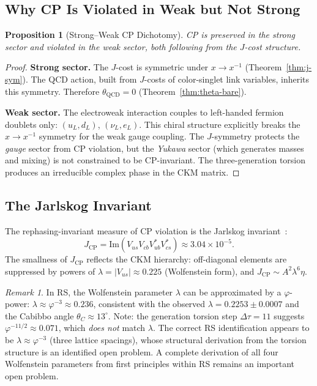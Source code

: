 \documentclass[12pt,a4paper]{article}
\newtheorem{proposition}[theorem]{Proposition}
\theoremstyle{definition}
\theoremstyle{remark}
\newtheorem{remark}[theorem]{Remark}
\begin{document}
\subsection{Why CP Is Violated in Weak but Not Strong}

\begin{proposition}[Strong--Weak CP Dichotomy]
\label{prop:dichotomy}
CP is preserved in the strong sector and violated in the weak
sector, both following from the $J$-cost structure.
\end{proposition}

\begin{proof}
\textbf{Strong sector.}
The $J$-cost is symmetric under $x \to x^{-1}$
(Theorem~\ref{thm:j-sym}).  The QCD action, built from
$J$-costs of color-singlet link variables, inherits this
symmetry.  Therefore $\theta_{\mathrm{QCD}} = 0$
(Theorem~\ref{thm:theta-bare}).

\textbf{Weak sector.}
The electroweak interaction couples to left-handed fermion
doublets only: $(u_L, d_L)$, $(\nu_L, e_L)$.  This chiral
structure explicitly breaks the $x \to x^{-1}$ symmetry for
the weak gauge coupling.  The $J$-symmetry protects the
\emph{gauge} sector from CP violation, but the
\emph{Yukawa} sector (which generates masses and mixing) is
not constrained to be CP-invariant.  The three-generation
torsion produces an irreducible complex phase in the CKM matrix.
\end{proof}

\subsection{The Jarlskog Invariant}

The rephasing-invariant measure of CP violation is the
Jarlskog invariant~\cite{Jarlskog1985}:
\begin{equation}
  J_{\mathrm{CP}} =
  \mathrm{Im}(V_{us} V_{cb} V_{ub}^* V_{cs}^*)
  \approx 3.04 \times 10^{-5}.
  \label{eq:jarlskog}
\end{equation}
The smallness of $J_{\mathrm{CP}}$ reflects the CKM
hierarchy: off-diagonal elements are suppressed by powers of
$\lambda = |V_{us}| \approx 0.225$ (Wolfenstein form),
and $J_{\mathrm{CP}} \sim A^2 \lambda^6 \eta$.

\begin{remark}
In RS, the Wolfenstein parameter $\lambda$ can be approximated
by a $\varphi$-power: $\lambda \approx \varphi^{-3} \approx 0.236$,
consistent with the observed $\lambda = 0.2253 \pm 0.0007$ and the
Cabibbo angle $\theta_C \approx 13^\circ$.  Note: the generation
torsion step $\Delta\tau = 11$ suggests $\varphi^{-11/2} \approx 0.071$,
which \emph{does not} match $\lambda$.  The correct RS identification
appears to be $\lambda \approx \varphi^{-3}$ (three lattice spacings),
whose structural derivation from the torsion structure is an
identified open problem.  A complete derivation of all four Wolfenstein
parameters from first principles within RS remains an important
open problem.
\end{remark}
\end{document}
